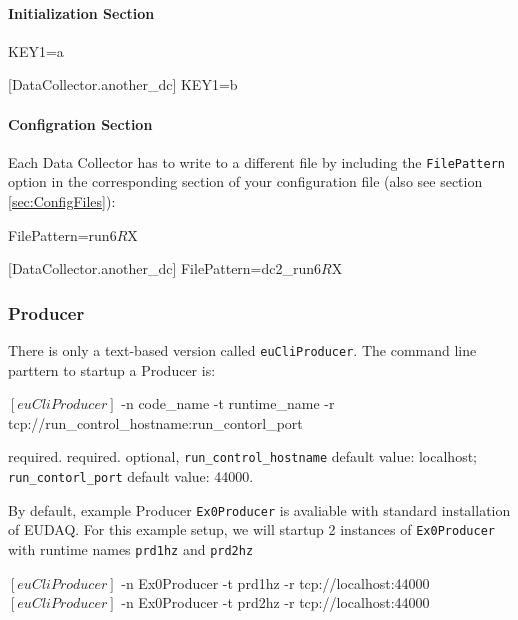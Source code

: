 \paragraph{Initialization Section}
\begin{listing}[conf]
[DataCollector.my_dc]
KEY1=a

[DataCollector.another_dc]
KEY1=b
\end{listing}

\paragraph{Configration Section}
Each Data Collector has to write to a different file by including the
\texttt{FilePattern} option in the corresponding section of your
configuration file (also see section \ref{sec:ConfigFiles}):

\begin{listing}[conf]
[DataCollector.my_dc]
FilePattern=run$6R$X

[DataCollector.another_dc]
FilePattern=dc2_run$6R$X
\end{listing}


\subsubsection{Producer}
\label{sec:testproducer}
There is only a text-based version called \texttt{euCliProducer}.
The command line parttern to startup a Producer is:
\begin{listing}[mybash]
$[euCliProducer]$ -n {code_name} -t {runtime_name} -r tcp://{run_control_hostname}:{run_contorl_port}
\end{listing}

\begin{description}
required.
required.
optional, \texttt{run\_control\_hostname} default value: localhost;  \texttt{run\_contorl\_port}  default value: 44000.
\end{description}

By default, example Producer \texttt{Ex0Producer} is avaliable with standard installation of EUDAQ.
For this example setup, we will startup 2 instances of \texttt{Ex0Producer} with runtime names \texttt{prd1hz} and \texttt{prd2hz}\\
\begin{listing}[mybash]
$[euCliProducer]$ -n Ex0Producer -t prd1hz -r tcp://localhost:44000
$[euCliProducer]$ -n Ex0Producer -t prd2hz -r tcp://localhost:44000
\end{listing}


